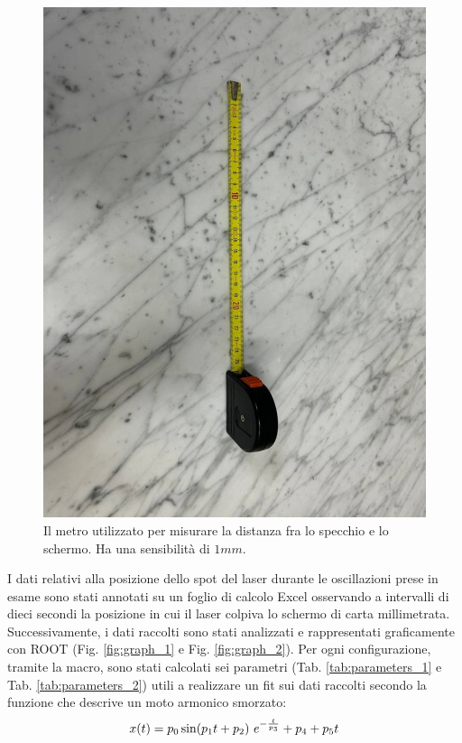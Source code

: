 \documentclass{article}
\begin{document}
\begin{figure}[ht!]
\begin{minipage}[t]{0.3\linewidth}
        \includegraphics[width=\linewidth]{images/metro.jpg}
        \caption{Il metro utilizzato per misurare la distanza fra lo specchio e lo schermo. Ha una sensibilità di $1mm$.}
        \label{fig:metro}
    \end{minipage}
\end{figure}

I dati relativi alla posizione dello spot del laser durante le oscillazioni prese in esame sono stati annotati su un foglio di calcolo Excel osservando a intervalli di dieci secondi la posizione in cui il laser colpiva lo schermo di carta millimetrata. Successivamente, i dati raccolti sono stati analizzati e rappresentati graficamente con ROOT (Fig. \ref{fig:graph_1} e Fig. \ref{fig:graph_2}). Per ogni configurazione, tramite la macro, sono stati calcolati sei parametri (Tab. \ref{tab:parameters_1} e Tab. \ref{tab:parameters_2}) utili a realizzare un fit sui dati raccolti secondo la funzione che descrive un moto armonico smorzato:
\begin{equation}
    x(t)=p_0\sin(p_1t + p_2)\ e^{-\frac{t}{p_3}}\\ + p_4 +p_5t
\end{equation}
\end{document}
